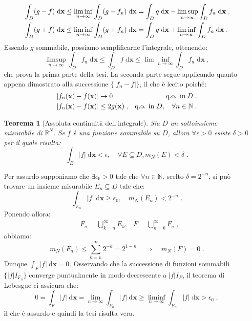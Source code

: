 \documentclass[a4paper,12pt]{report}
\theoremstyle{plain}
\newtheorem{thm}{Teorema}[section]
\theoremstyle{definition}
\theoremstyle{remark}
\newcommand{\diff}[1]{\mathrm{d}#1}
\numberwithin{equation}{section}
\begin{document}
\begin{align}
&\int_D(g-f)\;\diff{\mathbf{x}}\le \liminf_{n\to\infty}\int_D(g-f_n)\;\diff{\mathbf{x}}=\int_Dg\;\diff{\mathbf{x}}-\limsup_{n\to\infty}\int_D f_n\;\diff{\mathbf{x}}\;, \notag \\
&\int_D(g+f)\;\diff{\mathbf{x}}\le\liminf_{n\to\infty}\int_D(g+f_n)\;\diff{\mathbf{x}}=\int_Dg\;\diff{\mathbf{x}}+\liminf_{n\to\infty}\int_Df_n\;\diff{\mathbf{x}}\;.
\end{align}
Essendo $g$ sommabile, possiamo semplificarne l'integrale, ottenendo:
\begin{equation}
\limsup_{n\to\infty}\int_Df_n\;\diff{\mathbf{x}}\le\int_D f\;\diff{\mathbf{x}}\le \lim\inf_{n\to \infty}\int_Df_n\;\diff{\mathbf{x}}\;,
\end{equation}
che prova la prima parte della tesi. La seconda parte segue applicando quanto appena dimostrato alla successione $\{|f_n-f|\}$, il che è 
lecito poiché:
\begin{align}
&|f_n(\mathbf{x})-f(\mathbf{x})|\to 0 &\mbox{q.o. in}\; D\;, \notag \\
&|f_n(\mathbf{x})-f(\mathbf{x})|\le 2g(\mathbf{x})\;, &\mbox{q.o. in}\; D,\quad \forall n\in\mathbb{N}\;.
\end{align}
\endproof
\begin{thm}[Assoluta continuità dell'integrale] Sia $D$ un sottoinsieme misurabile di $\mathbb{R}^N$. Se $f$ è una funzione sommabile su $D$, allora $\forall \epsilon>0$ esiste $\delta>0$ per il quale risulta:
\begin{equation}
\int_E |f|\;\diff{\mathbf{x}}<\epsilon, \quad \forall E\subseteq D, m_N(E)<\delta\;.
\end{equation}
\end{thm}
\proof Per assurdo supponiamo che $\exists \epsilon_0>0$ tale che $\forall n \in \mathbb{N}$, scelto $\delta=2^{-n}$, si può trovare un insieme misurabile $E_n\subseteq D$ tale che:
\begin{equation}
\int_{E_n} |f|\;\diff{\mathbf{x}}\ge \epsilon_0, \quad m_N(E_n)<2^{-n}\;.
\end{equation}
Ponendo allora:
\begin{align}
&F_n=\bigcup_{k=n}^{\infty} E_k, &F=\bigcup_{n=0}^{\infty}F_n\;,
\end{align}
abbiamo:
\begin{equation}
m_N(F_n)\le \sum_{k=n}^{\infty} 2^{-k}=2^{1-n} \quad \Longrightarrow\quad m_N(F)=0\;.
\end{equation}
Dunque $\int_F |f|\;\diff{\mathbf{x}}=0$. Osservando che la successione di funzioni sommabili $\{|f|I_{F_n}\}$ converge puntualmente in modo decrescente a $|f|I_F$, il teorema di Lebesgue ci assicura che:
\begin{equation}
0=\int_F |f|\;\diff{\mathbf{x}}=\lim_{n\to\infty}\int_{F_n}|f|\;\diff{\mathbf{x}}\ge \liminf_{n\to\infty}\int_{E_n}|f|\;\diff{\mathbf{x}}>\epsilon_0\;,
\end{equation}
il che è assurdo e quindi la tesi risulta vera.
\endproof
\end{document}
